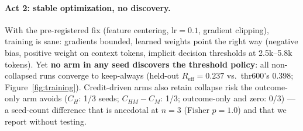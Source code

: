 \documentclass{article}
\theoremstyle{remark}
\begin{document}
\paragraph{Act 2: stable optimization, no discovery.} With the
pre-registered fix (feature centering, $\text{lr} = 0.1$, gradient clipping),
training is sane: gradients bounded, learned weights point the right way
(negative bias, positive weight on context tokens, implicit decision
thresholds at 2.5k--5.8k tokens). Yet \textbf{no arm in any seed discovers
the threshold policy}: all non-collapsed runs converge to keep-always
(held-out $R_{\text{eff}} = 0.237$ vs.\ thr600's 0.398;
Figure~\ref{fig:training}). Credit-driven arms also retain collapse risk
the outcome-only arm avoids ($C_H$: 1/3 seeds; $C_{HM}-C_M$: 1/3;
outcome-only and zero: 0/3) --- a seed-count difference that is anecdotal
at $n=3$ (Fisher $p=1.0$) and that we report without testing.
\end{document}
